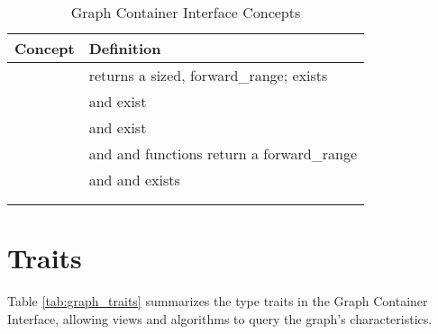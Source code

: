 \begin{table}[h!]
\begin{center}
{\begin{tabular}{l L{12.0cm}}
\hline
    \textbf{Concept} & \textbf{Definition} \\
\hline
     &  returns a sized, forward\_range;  exists\\
     &  and  exist\\
     &  and  exist\\
     &  and  and  functions return a forward\_range\\
     &  and  and      exists \\
\hline
     &  \\
     &  \\
\hline
\end{tabular}}
\caption{Graph Container Interface Concepts}
\label{tab:graph_concepts}
\end{center}
\end{table}

\section{Traits}
Table \ref{tab:graph_traits} summarizes the type traits in the Graph Container Interface, allowing views and algorithms to query the graph's characteristics.

